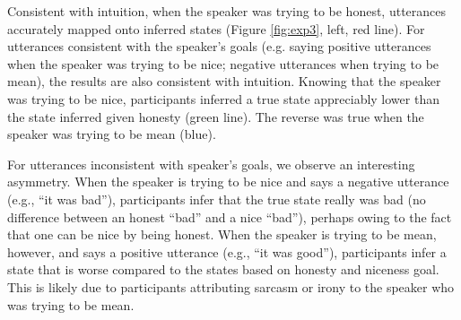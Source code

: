 \documentclass[10pt,letterpaper]{article}
\begin{document}
Consistent with intuition, when the speaker was trying to be honest, utterances accurately mapped onto inferred states (Figure \ref{fig:exp3}, left, red line).
For utterances consistent with the speaker's goals (e.g. saying positive utterances when the speaker was trying to be nice; negative utterances when trying to be mean), the results are also consistent with intuition.
Knowing that the speaker was trying to be nice, participants inferred a true state appreciably lower than the state inferred given honesty (green line).
The reverse was true when the speaker was trying to be mean (blue).

For utterances inconsistent with speaker's goals, we observe an interesting asymmetry.
When the speaker is trying to be nice and says a negative utterance (e.g., ``it was bad''), participants infer that the true state really was bad (no difference between an honest ``bad'' and a nice ``bad''), perhaps owing to the fact that one can be nice by being honest.
When the speaker is trying to be mean, however, and says a positive utterance (e.g., ``it was good''), participants infer a state that is worse compared to the states based on honesty and niceness goal.
This is likely due to participants attributing sarcasm or irony to the speaker who was trying to be mean.
\end{document}
